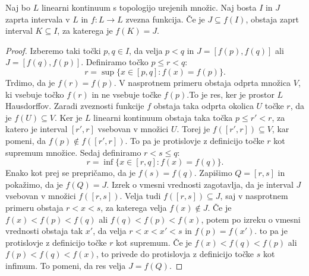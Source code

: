 \documentclass[../TG_magistrsko_delo_sections.tex]{subfiles}
\begin{document}
\begin{lema}\label{lem:K}
Naj bo $L$ linearni kontinuum s topologijo urejenih množic. Naj bosta $I$ in $J$ zaprta intervala v $L$ in $f:L \to L$ zvezna funkcija. Če je $J \subseteq f(I)$, obstaja zaprt interval $K \subseteq I$, za katerega je $f(K) = J$.
\end{lema}
\begin{proof}
Izberemo taki točki $p, q \in I$, da velja $p<q$ in $J=[f(p), f(q)]$ ali $J=[f(q), f(p)]$. Definiramo točko $p \leq r < q$:
$$r= \sup\{x \in [p, q] : f(x) = f(p)\}.$$
Trdimo, da je $f(r) = f(p)$. V nasprotnem primeru obstaja odprta množica $V$, ki vsebuje točko $f(r)$ in ne vsebuje točke $f(p)$.To je res, ker je prostor $L$ Hausdorffov. Zaradi zveznosti funkcije $f$ obstaja taka odprta okolica $U$ točke $r$, da je $f(U) \subseteq V$. Ker je $L$ linearni kontinuum obstaja taka točka $p \leq r' < r$, za katero je interval $[r', r]$ vsebovan v množici $U$. Torej je $f([r', r]) \subseteq V$, kar pomeni, da $f(p) \notin f([r', r])$. To pa je protislovje z definicijo točke $r$ kot supremum množice.
Sedaj definiramo $r<s \leq q$:
$$r= \inf\{x \in [r, q] : f(x) = f(q)\}.$$ 
Enako kot prej se prepričamo, da je $f(s) = f(q)$. Zapišimo $Q = [r, s]$ in pokažimo, da je $f(Q) = J$. Izrek o vmesni vrednosti zagotavlja, da je interval $J$ vsebovan v množici $f([r, s])$. Velja tudi $f([r, s]) \subseteq J$, saj v nasprotnem primeru obstaja $r<x<s$, za katerega velja $f(x) \notin J$. Če je $f(x) < f(p) < f(q)$ ali $f(q) < f(p) < f(x)$, potem po izreku o vmesni vrednosti obstaja tak $x'$, da velja $r<x<x'<s$ in $f(p) = f(x')$. to pa je protislovje z definicijo točke $r$ kot supremum. Če je $f(x) < f(q) < f(p)$ ali $f(p) < f(q) < f(x)$, to privede do protislovja z definicijo točke $s$ kot infimum. To pomeni, da res velja $J = f(Q)$.
\end{proof}
\end{document}
